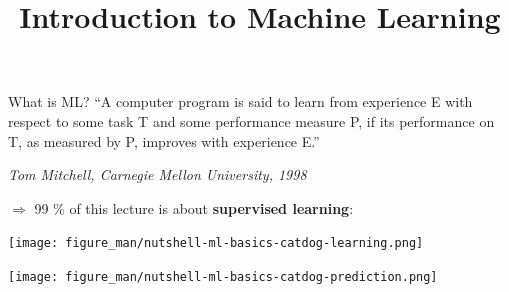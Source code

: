 \documentclass[11pt,compress,t,notes=noshow, xcolor=table]{beamer}
\title{Introduction to Machine Learning}
\begin{document}

\sloppy


\begin{vbframe}{What is ML?}
    ``A computer program is said to learn from experience E with respect to
  some task T and some performance measure P, if its performance on T, as
  measured by P, improves with experience E.''\\
  \begin{footnotesize}
  \emph{Tom Mitchell, Carnegie Mellon University, 1998}\\
  \end{footnotesize}

\vspace{1ex}

$\Rightarrow$ 99 $\%$ of this lecture is about \textbf{supervised learning}:
{
\begin{center}
  \texttt{[image: figure\_man/nutshell-ml-basics-catdog-learning.png]}
\end{center}
}
{
\begin{center}
  \texttt{[image: figure\_man/nutshell-ml-basics-catdog-prediction.png]}
\end{center}
}

\end{vbframe}
\end{document}
